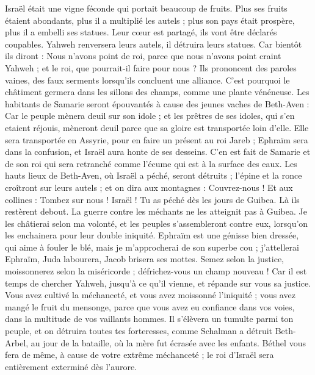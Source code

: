 \begin{multicols}{2}
\VerseOne{}Israël était une vigne féconde qui portait beaucoup de fruits. Plus ses fruits étaient abondants, plus il a multiplié les autels ; plus son pays était prospère, plus il a embelli ses statues.
Leur cœur est partagé, ils vont être déclarés coupables. Yahweh renversera leurs autels, il détruira leurs statues.
Car bientôt ils diront : Nous n'avons point de roi, parce que nous n'avons point craint Yahweh ; et le roi, que pourrait-il faire pour nous ?
Ils prononcent des paroles vaines, des faux serments lorsqu’ils concluent une alliance. C'est pourquoi le châtiment germera dans les sillons des champs, comme une plante vénéneuse.
Les habitants de Samarie seront épouvantés à cause des jeunes vaches de Beth-Aven : Car le peuple mènera deuil sur son idole ; et les prêtres de ses idoles, qui s'en etaient réjouis, mèneront deuil parce que sa gloire est transportée loin d'elle.
Elle sera transportée en Assyrie, pour en faire un présent au roi Jareb ; Ephraïm sera dans la confusion, et Israël aura honte de ses desseins.
C’en est fait de Samarie et de son roi qui sera retranché comme l'écume qui est à la surface des eaux.
Les hauts lieux de Beth-Aven, où Israël a péché, seront détruits ; l'épine et la ronce croîtront sur leurs autels ; et on dira aux montagnes : Couvrez-nous ! Et aux collines : Tombez sur nous !
Israël ! Tu as péché dès les jours de Guibea. Là ils restèrent debout. La guerre contre les méchants ne les atteignit pas à Guibea.
Je les châtierai selon ma volonté, et les peuples s’assembleront contre eux, lorsqu’on les enchainera pour leur double iniquité.
Ephraïm est une génisse bien dressée, qui aime à fouler le blé, mais je m’approcherai de son superbe cou ; j’attellerai Ephraïm, Juda labourera, Jacob brisera ses mottes.
Semez selon la justice, moissonnerez selon la miséricorde ; défrichez-vous un champ nouveau ! Car il est temps de chercher Yahweh, jusqu'à ce qu'il vienne, et répande sur vous sa justice.
Vous avez cultivé la méchanceté, et vous avez moissonné l’iniquité ; vous avez mangé le fruit du mensonge, parce que vous avez eu confiance dans vos voies, dans la multitude de vos vaillants hommes.
Il s'élèvera un tumulte parmi ton peuple, et on détruira toutes tes forteresses, comme Schalman a détruit Beth-Arbel, au jour de la bataille, où la mère fut écrasée avec les enfants.
Béthel vous fera de même, à cause de votre extrême méchanceté ; le roi d'Israël sera entièrement exterminé dès l’aurore.

\end{multicols}
